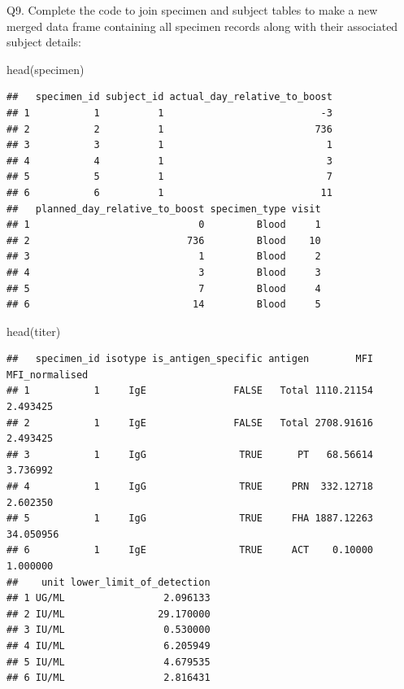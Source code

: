 \documentclass[
]{article}
\newenvironment{Shaded}{\begin{snugshade}}{\end{snugshade}}
\newcommand{\FunctionTok}[1]{\textcolor[rgb]{0.00,0.00,0.00}{#1}}
\newcommand{\NormalTok}[1]{#1}
\begin{document}
Q9. Complete the code to join specimen and subject tables to make a new
merged data frame containing all specimen records along with their
associated subject details:

\begin{Shaded}
\begin{Highlighting}[]
\FunctionTok{head}\NormalTok{(specimen)}
\end{Highlighting}
\end{Shaded}

\begin{verbatim}
##   specimen_id subject_id actual_day_relative_to_boost
## 1           1          1                           -3
## 2           2          1                          736
## 3           3          1                            1
## 4           4          1                            3
## 5           5          1                            7
## 6           6          1                           11
##   planned_day_relative_to_boost specimen_type visit
## 1                             0         Blood     1
## 2                           736         Blood    10
## 3                             1         Blood     2
## 4                             3         Blood     3
## 5                             7         Blood     4
## 6                            14         Blood     5
\end{verbatim}

\begin{Shaded}
\begin{Highlighting}[]
\FunctionTok{head}\NormalTok{(titer)}
\end{Highlighting}
\end{Shaded}

\begin{verbatim}
##   specimen_id isotype is_antigen_specific antigen        MFI MFI_normalised
## 1           1     IgE               FALSE   Total 1110.21154       2.493425
## 2           1     IgE               FALSE   Total 2708.91616       2.493425
## 3           1     IgG                TRUE      PT   68.56614       3.736992
## 4           1     IgG                TRUE     PRN  332.12718       2.602350
## 5           1     IgG                TRUE     FHA 1887.12263      34.050956
## 6           1     IgE                TRUE     ACT    0.10000       1.000000
##    unit lower_limit_of_detection
## 1 UG/ML                 2.096133
## 2 IU/ML                29.170000
## 3 IU/ML                 0.530000
## 4 IU/ML                 6.205949
## 5 IU/ML                 4.679535
## 6 IU/ML                 2.816431
\end{verbatim}
\end{document}
